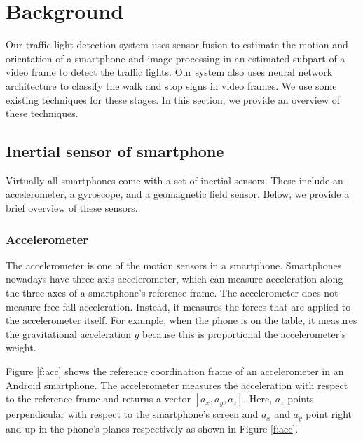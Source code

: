 \chapter{Background}
\label{c:background}
Our traffic light detection system uses sensor fusion to estimate the motion and orientation of a smartphone and image processing in an estimated subpart of a video frame to detect the traffic lights.
Our system also uses neural network architecture to classify the walk and stop signs in video frames.
We use some existing techniques for these stages. 
In this section, we provide an overview of these techniques. 


\section{Inertial sensor of smartphone}
\label{s:sensor}
Virtually all smartphones come with a set of inertial sensors. These include an accelerometer, a gyroscope, and a geomagnetic field sensor. 
Below, we provide a brief overview of these sensors. 


\subsection{Accelerometer}
The accelerometer is one of the motion sensors in a smartphone.
Smartphones nowadays have three axis accelerometer, which can measure acceleration along the three axes of a smartphone's reference frame.
The accelerometer does not measure free fall acceleration.
Instead, it measures the forces that are applied to the accelerometer itself.
For example, when the phone is on the table, it measures the gravitational acceleration $g$ because this is proportional the accelerometer's weight.

Figure \ref{f:acc} shows the reference coordination frame of an accelerometer in an Android smartphone.
The accelerometer measures the acceleration with respect to the reference frame and returns a vector $[a_x, a_y, a_z]$.
Here, $a_z$ points perpendicular with respect to the smartphone's screen and $a_x$ and $a_y$ point right and up in the phone's planes respectively as shown in Figure \ref{f:acc}.

